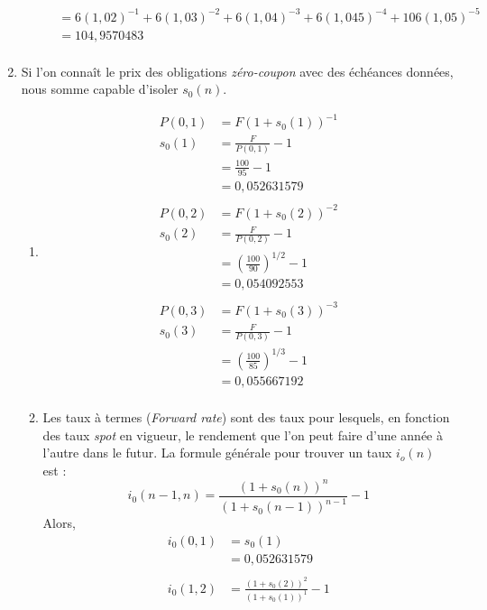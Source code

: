 \begin{enumerate}
\begin{enumerate}[label=\alph*)]
\begin{align*}
          & = 6(1,02)^{-1} + 6(1,03)^{-2} + 6(1,04)^{-3} + 6(1,045)^{-4} + 106(1,05)^{-5} \\
          & = 104,9570483 \\
    \end{align*}
  \end{enumerate} %
  \item Si l'on connaît le prix des obligations \emph{zéro-coupon} avec des échéances
  données, nous somme capable d'isoler $s_0(n)$.
  \begin{enumerate}[label=\alph*)]
    \item %
    \begin{align*}
      P(0,1)  & = F(1+s_0(1))^{-1} \\
      s_0(1)  & = \frac{F}{P(0,1)} - 1 \\
              & = \frac{100}{95} -1 \\
              & = 0,052631579 \\
      \\
      P(0,2)  & = F(1+s_0(2))^{-2} \\
      s_0(2)  & = \frac{F}{P(0,2)} - 1 \\
              & = \left( \frac{100}{90} \right)^{1/2} -1 \\
              & = 0,054092553 \\
      \\
      P(0,3)  & = F(1+s_0(3))^{-3} \\
      s_0(3)  & = \frac{F}{P(0,3)} - 1 \\
              & = \left( \frac{100}{85} \right)^{1/3} -1 \\
              & = 0,055667192 \\
    \end{align*}
    \item Les taux à termes (\emph{Forward rate}) sont des taux pour lesquels, en
    fonction des taux \emph{spot} en vigueur, le rendement que l'on peut faire
    d'une année à l'autre dans le futur.
    \p
    La formule générale pour trouver un taux $i_o(n)$ est :
    \begin{displaymath}
      i_0(n-1,n) = \frac{(1+s_0(n))^n}{(1+s_0(n-1))^{n-1}} -1
    \end{displaymath}
    Alors,
    \begin{align*}
      i_0(0,1)  & = s_0(1) \\
                & = 0,052631579 \\
      \\
      i_0(1,2)  & = \frac{(1+s_0(2))^2}{(1+s_0(1))^1} -1  \\

\end{align*}
\end{enumerate}
\end{enumerate}
